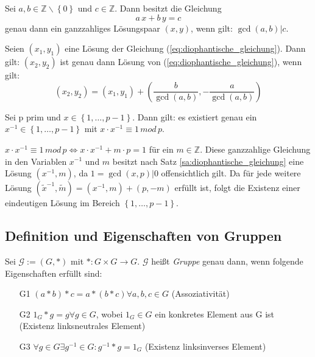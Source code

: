 \documentclass[10pt]{scrbook}
\begin{document}
\begin{Sa}\label{sa:diophantische_gleichung}Sei $a, b\in\mathbb{Z}\backslash \left\{0\right\}$ und $c\in\mathbb{Z}$. Dann besitzt die Gleichung
\begin{equation}
	a\,x+b\,y=c
	\label{eq:diophantische_gleichung}
\end{equation}
genau dann ein ganzzahliges Lösungspaar $(x, y)$, wenn gilt: $\gcd(a, b)|c$. 

Seien $(x_1, y_1)$ eine Lösung der Gleichung (\ref{eq:diophantische_gleichung}). Dann gilt: $(x_2, y_2)$ ist genau dann Lösung von (\ref{eq:diophantische_gleichung}), wenn gilt:
\begin{displaymath}
	\left(x_2, y_2\right)=\left(x_1, y_1\right)+\left(\frac{b}{\gcd(a,b)}, -\frac{a}{\gcd(a,b)}\right)
\end{displaymath}
\end{Sa}
\begin{Kor}
Sei p prim und $x\in\left\{1, \ldots, p-1\right\}$. Dann gilt: es existiert genau ein $x^{-1}\in \left\{1, \ldots, p-1\right\}$ mit $x\cdot x^{-1}\equiv 1\,mod\,p$.
\end{Kor}
\begin{bew}
$x\cdot x^{-1}\equiv 1\,mod\,p\Leftrightarrow x\cdot x^{-1}+m\cdot p=1$ für ein $m\in \mathbb{Z}$. Diese ganzzahlige Gleichung in den Variablen $x^{-1}$ und $m$ besitzt nach Satz \ref{sa:diophantische_gleichung} eine Lösung $(x^{-1}, m)$, da $1=\gcd(x, p)|0$ offensichtlich gilt. Da für jede weitere Lösung $(\tilde{x}^{-1}, \tilde{m})=\left(x^{-1}, m\right)+\left(p, -m\right)$ erfüllt ist, folgt die Existenz einer eindeutigen Lösung im Bereich $\left\{1, \ldots, p-1\right\}$.
\end{bew}

\subsection{Definition und Eigenschaften von Gruppen}
\begin{Def}
Sei $\mathcal{G}:=(G, *)$ mit $*: G \times G \rightarrow G$. $\mathcal{G}$ heißt \emph{Gruppe} genau dann, wenn folgende Eigenschaften erfüllt sind:
\begin{enumerate}
	\item[G1] $(a*b)*c=a*(b*c)\forall a, b, c\in G$ (Assoziativität)
	\item[G2] $1_G*g=g\forall g\in G$, wobei $1_G\in G$ ein konkretes Element aus G ist (Existenz linksneutrales Element)
	\item[G3] $\forall g\in G\exists g^{-1}\in G: g^{-1}*g=1_G$ (Existenz linksinverses Element)
\end{enumerate}
\end{Def}
\end{document}
